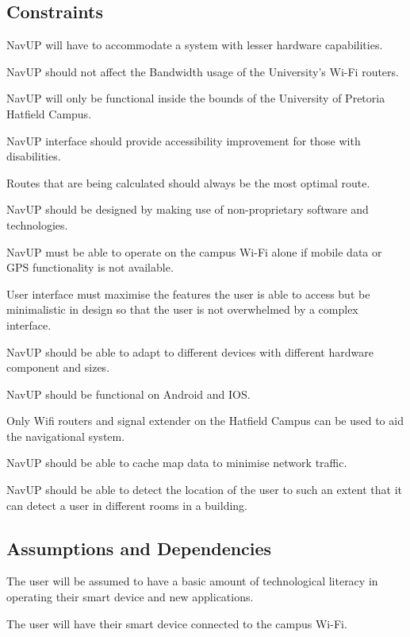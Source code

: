 \documentclass[12pt,a4paper]{article}
\begin{document}
	\subsection{Constraints}
		\begin{ConstraintEnum}
			\item NavUP will have to accommodate a system with lesser hardware capabilities.
			\item NavUP should not affect the Bandwidth usage of the University's Wi-Fi routers.
			\item NavUP will only be functional inside the bounds of the University of Pretoria Hatfield Campus.
			\item NavUP interface should provide accessibility improvement for those with disabilities.
			\item Routes that are being calculated should always be the most optimal route.
			\item NavUP should be designed by making use of non-proprietary software and technologies.
			\item NavUP must be able to operate on the campus Wi-Fi alone if mobile data or GPS functionality is not available.
			\item User interface must maximise the features the user is able to access but be minimalistic in design so that the user is not overwhelmed by a complex interface.
			\item NavUP should be able to adapt to different devices with different hardware component and sizes.
			\item NavUP should be functional on Android and IOS.
			\item Only Wifi routers and signal extender on the Hatfield Campus can be used to aid the navigational system.
			\item NavUP should be able to cache map data to minimise network traffic.
			\item NavUP should be able to detect the location of the user to such an extent that it can detect a user in different rooms in a building.
		\end{ConstraintEnum}
	\subsection{Assumptions and Dependencies}
		\begin{AssumptionsEnum}
			\item The user will be assumed to have a basic amount of technological literacy in operating their smart device and new applications.
		\end{AssumptionsEnum}
		\begin{DependenciesEnum}
			\item The user will have their smart device connected to the campus Wi-Fi.
		\end{DependenciesEnum}
\end{document}
